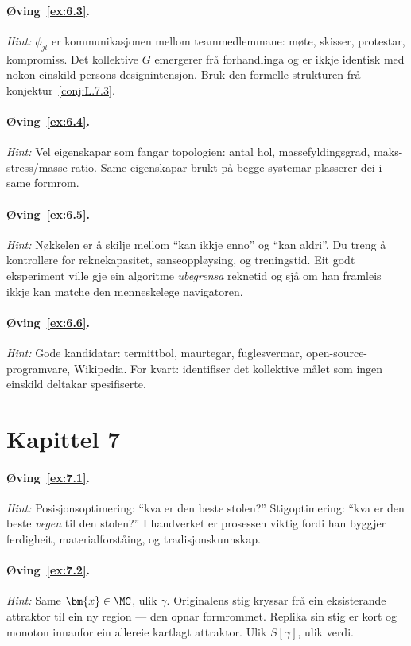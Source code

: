 \paragraph{Øving~\ref{ex:6.3}.}
\emph{Hint:} $\phi_{jl}$ er kommunikasjonen mellom
teammedlemmane: møte, skisser, protestar, kompromiss. Det
kollektive $G$ emergerer frå forhandlinga og er ikkje identisk med
nokon einskild persons designintensjon. Bruk den formelle
strukturen frå konjektur~\ref{conj:L.7.3}.

\paragraph{Øving~\ref{ex:6.4}.}
\emph{Hint:} Vel eigenskapar som fangar topologien: antal hol,
massefyldingsgrad, maks-stress/masse-ratio. Same eigenskapar
brukt på begge systemar plasserer dei i same formrom.

\paragraph{Øving~\ref{ex:6.5}.}
\emph{Hint:} Nøkkelen er å skilje mellom ``kan ikkje enno'' og
``kan aldri''. Du treng å kontrollere for reknekapasitet,
sanseoppløysing, og treningstid. Eit godt eksperiment ville gje
ein algoritme \emph{ubegrensa} reknetid og sjå om han framleis
ikkje kan matche den menneskelege navigatoren.

\paragraph{Øving~\ref{ex:6.6}.}
\emph{Hint:} Gode kandidatar: termittbol, maurtegar,
fuglesvermar, open-source-programvare, Wikipedia. For kvart:
identifiser det kollektive målet som ingen einskild deltakar
spesifiserte.


\section*{Kapittel 7}

\paragraph{Øving~\ref{ex:7.1}.}
\emph{Hint:} Posisjonsoptimering: ``kva er den beste stolen?''
Stigoptimering: ``kva er den beste \emph{vegen} til den
stolen?'' I handverket er prosessen viktig fordi han byggjer
ferdigheit, materialforståing, og tradisjonskunnskap.

\paragraph{Øving~\ref{ex:7.2}.}
\emph{Hint:} Same $\bm{x} \in \MC$, ulik $\gamma$. Originalens
stig kryssar frå ein eksisterande attraktor til ein ny region ---
den opnar formrommet. Replika sin stig er kort og monoton innanfor
ein allereie kartlagt attraktor. Ulik $S[\gamma]$, ulik verdi.

